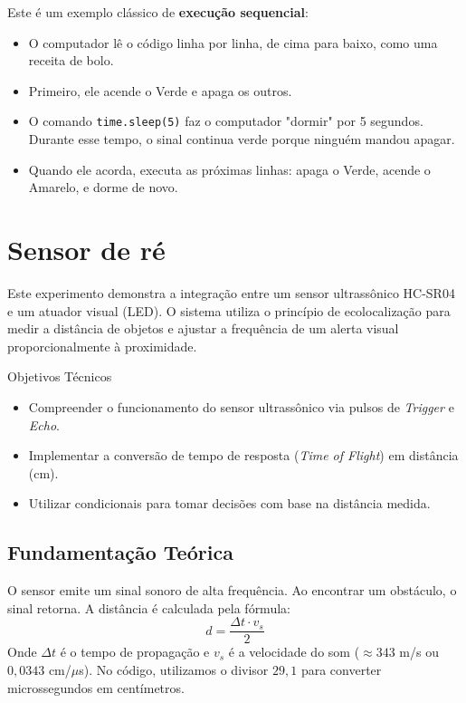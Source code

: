 \documentclass[lang=pt,11pt]{elegantbook}
\begin{document}
Este é um exemplo clássico de \textbf{execução sequencial}:

\begin{itemize}
    \item O computador lê o código linha por linha, de cima para baixo, como uma receita de bolo.
    \item Primeiro, ele acende o Verde e apaga os outros.
    \item O comando \lstinline{time.sleep(5)} faz o computador "dormir" por 5 segundos. Durante esse tempo, o sinal continua verde porque ninguém mandou apagar.
    \item Quando ele acorda, executa as próximas linhas: apaga o Verde, acende o Amarelo, e dorme de novo.
\end{itemize}

\section{Sensor de ré}

Este experimento demonstra a integração entre um sensor ultrassônico HC-SR04 e um atuador visual (LED). O sistema utiliza o princípio de ecolocalização para medir a distância de objetos e ajustar a frequência de um alerta visual proporcionalmente à proximidade.

Objetivos Técnicos
\begin{itemize}
    \item Compreender o funcionamento do sensor ultrassônico via pulsos de \textit{Trigger} e \textit{Echo}.
    \item Implementar a conversão de tempo de resposta (\textit{Time of Flight}) em distância (cm).
    \item Utilizar condicionais para tomar decisões com base na distância medida.
\end{itemize}

\subsection{Fundamentação Teórica}
O sensor emite um sinal sonoro de alta frequência. Ao encontrar um obstáculo, o sinal retorna. A distância é calculada pela fórmula:
$$d = \frac{\Delta t \cdot v_s}{2}$$
Onde $\Delta t$ é o tempo de propagação e $v_s$ é a velocidade do som ($\approx 343$ m/s ou $0,0343$ cm/$\mu$s). No código, utilizamos o divisor $29,1$ para converter microssegundos em centímetros.
\end{document}
